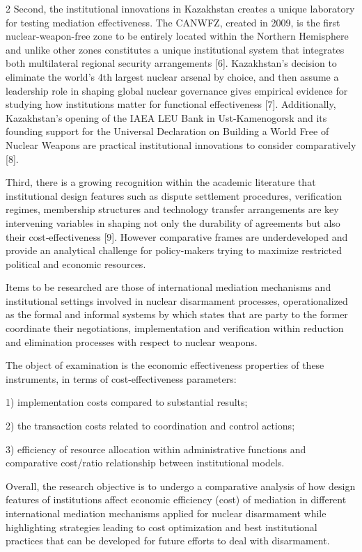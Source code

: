 \begin{multicols}{2}
Second, the institutional innovations in Kazakhstan creates a unique
laboratory for testing mediation effectiveness. The CANWFZ, created in
2009, is the first nuclear-weapon-free zone to be entirely located
within the Northern Hemisphere and unlike other zones constitutes a
unique institutional system that integrates both multilateral regional
security arrangements {[}6{]}. Kazakhstan's decision to eliminate the
world's 4th largest nuclear arsenal by choice, and then assume a
leadership role in shaping global nuclear governance gives empirical
evidence for studying how institutions matter for functional
effectiveness {[}7{]}. Additionally, Kazakhstan's opening of the IAEA
LEU Bank in Ust-Kamenogorsk and its founding support for the Universal
Declaration on Building a World Free of Nuclear Weapons are practical
institutional innovations to consider comparatively {[}8{]}.

Third, there is a growing recognition within the academic literature
that institutional design features such as dispute settlement
procedures, verification regimes, membership structures and technology
transfer arrangements are key intervening variables in shaping not only
the durability of agreements but also their cost‑effectiveness {[}9{]}.
However comparative frames are underdeveloped and provide an analytical
challenge for policy-makers trying to maximize restricted political and
economic resources.

Items to be researched are those of international mediation mechanisms
and institutional settings involved in nuclear disarmament processes,
operationalized as the formal and informal systems by which states that
are party to the former coordinate their negotiations, implementation
and verification within reduction and elimination processes with respect
to nuclear weapons.

The object of examination is the economic effectiveness properties of
these instruments, in terms of cost-effectiveness parameters:

1) implementation costs compared to substantial results;

2) the transaction costs related to coordination and control actions;

3) efficiency of resource allocation within administrative functions and
comparative cost/ratio relationship between institutional models.

Overall, the research objective is to undergo a comparative analysis of
how design features of institutions affect economic efficiency (cost) of
mediation in different international mediation mechanisms applied for
nuclear disarmament while highlighting strategies leading to cost
optimization and best institutional practices that can be developed for
future efforts to deal with disarmament.


\end{multicols}

